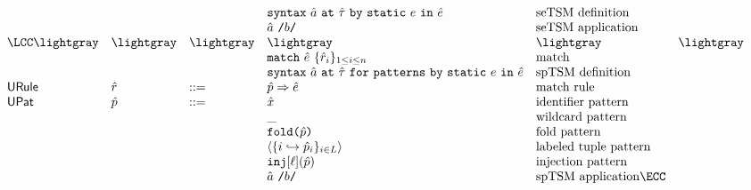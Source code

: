 \[\begin{array}{lllllll}
&&
& \uesyntax{\tsmv}{\utau}{e}{\ue} & \text{seTSM definition}\\ 
&&
& \utsmap{\tsmv}{b} & \text{seTSM application}\\%
\LCC  \lightgray & \lightgray & \lightgray
& \lightgray 
& \lightgray & \lightgray \\
&&
& \matchwith{\ue}{\seqschemaX{\urv}} & \text{match}\\
&&
& \usyntaxup{\tsmv}{\utau}{e}{\ue}
& \text{spTSM definition}\\
\mathsf{URule} & \urv & ::= 
& \matchrule{\upv}{\ue} & \text{match rule}\\
\mathsf{UPat} & \upv & ::= 
& \ux & \text{identifier pattern}\\
&&
& \wildp & \text{wildcard pattern}\\
&&
& \foldp{\upv} & \text{fold pattern}\\
&&
& \tplp{\mapschema{\upv}{i}{\labelset}} & \text{labeled tuple pattern}\\
&&
& \injp{\ell}{\upv} & \text{injection pattern}\\
&&
& \utsmap{\tsmv}{b} & \text{spTSM application}\ECC
\end{array}\]

\clearpage

